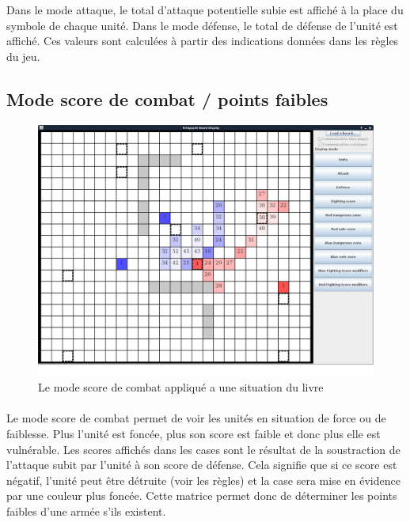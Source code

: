 			Dans le mode attaque, le total d'attaque potentielle subie est affiché à la place du symbole de chaque unité.
			Dans le mode défense, le total de défense de l'unité est affiché.
			Ces valeurs sont calculées à partir des indications données dans les règles du jeu.
			\clearpage	

		\subsection{Mode score de combat / points faibles}

			\begin{figure}[!h]
				\centerline{\includegraphics[scale=0.35]{images/screen_fscore.png}}
				\caption{Le mode score de combat appliqué a une situation du livre}
				\label{fig:partie_livre}
			\end{figure}
			
			\paragraph{}
			Le mode score de combat permet de voir les unités en situation de force ou de faiblesse.
			Plus l'unité est foncée, plus son score est faible et donc plus elle est vulnérable.
            Les scores affichés dans les cases sont le résultat de la soustraction de l'attaque subit par l'unité à son score de défense. Cela signifie que si ce score est négatif, l'unité peut être détruite (voir les règles) et la case sera mise en évidence par une couleur plus foncée.
			Cette matrice permet donc de déterminer les points faibles d'une armée s'ils existent.
			
